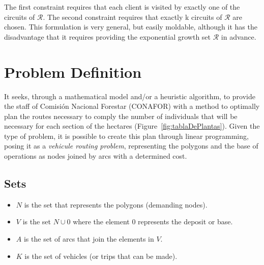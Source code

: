 \documentclass{amsart}
\begin{document}
            The first constraint requires that each client is visited by exactly one of the circuits of $\mathcal{R}$. The second constraint requires that exactly k circuits of $\mathcal{R}$ are chosen. This formulation is very general, but easily moldable, although it has the disadvantage that it requires providing the exponential growth set $\mathcal{R}$ in advance.






    \section{Problem Definition}
    It seeks, through a mathematical model and/or a heuristic algorithm, to provide the staff of Comisión Nacional Forestar (CONAFOR) with a method to optimally plan the routes necessary to comply the number of individuals that will be necessary for each section of the hectares (Figure~\ref{fig:tablaDePlantas}). Given the type of problem, it is possible to create this plan through linear programming, posing it as a \textit{vehicule routing problem}, representing the polygons and the base of operations as nodes joined by arcs with a determined cost.

        \subsection{Sets}
        \begin{itemize}
            \item $N$ is the set that represents the polygons (demanding nodes).
            \item $V$ is the set $N\cup {0}$ where the element $0$ represents the deposit or base.
            \item $A$ is the set of arcs that join the elements in $V$.
            \item $K$ is the set of vehicles (or trips that can be made).
        \end{itemize}
        
\end{document}
